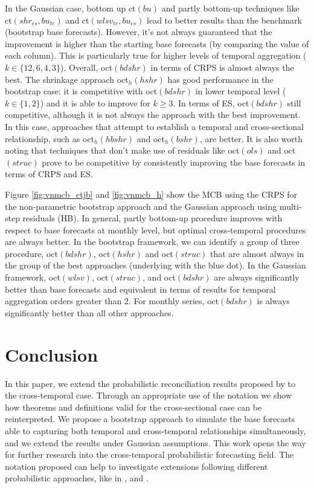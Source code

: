 \documentclass[a4paper,11pt]{article}
\theoremstyle{definition}
\begin{document}
In the Gaussian case, bottom up ct$(bu)$ and partly bottom-up techniques like ct$(shr_{cs}, bu_{te})$ and ct$(wlsv_{te}, bu_{cs})$ lead to better results than the benchmark (bootstrap base forecasts). However, it's not always guaranteed that the improvement is higher than the starting base forecasts (by comparing the value of each column). This is particularly true for higher levels of temporal aggregation ($k \in \{12, 6, 4, 3\}$). Overall, oct$(bdshr)$ in terms of CRPS is almost always the best. The shrinkage approach oct$_h(hshr)$ has good performance in the bootstrap case: it is competitive with oct$(bdshr)$ in lower temporal level ($k \in \{1,2\}$) and it is able to improve for $k\ge 3$. In terms of ES, oct$(bdshr)$ still competitive, although it is not always the approach with the best improvement. In this case, approaches that attempt to establish a temporal and cross-sectional relationship, such as oct$_h(hbshr)$ and oct$_h(bshr)$, are better. %
It is also worth noting that techniques that don't make use of residuals like oct$(ols)$ and oct$(struc)$ prove to be competitive by consistently improving the base forecasts in terms of CRPS and ES.

Figure \ref{fig:vnmcb_ctjb} and \ref{fig:vnmcb_h} show the MCB using the CRPS for the non-parametric bootstrap approach and the Gaussian approach using multi-step residuals (HB). In general, partly bottom-up procedure improves with respect to base forecasts at monthly level, but optimal cross-temporal procedures are always better. In the bootstrap framework, we can identify a group of three procedure, oct$(bdshr)$, oct$(hshr)$ and oct$(struc)$ that are almost always in the group of the best approaches (underlying with the blue dot). In the Gaussian framework, oct$(wlsv)$, oct$(struc)$, and oct$(bdshr)$ are always significantly better than base forecasts and equivalent in terms of results for temporal aggregation orders greater than 2. For monthly series, oct$(bdshr)$ is always significantly better than all other approaches.

\section{Conclusion}\label{sec:conclusion}

In this paper, we extend the probabilistic reconciliation results proposed by \cite{panagiotelis2023} to the cross-temporal case. Through an appropriate use of the notation we show how theorems and definitions valid for the cross-sectional case can be reinterpreted. We propose a bootstrap approach to simulate the base forecasts able to capturing both temporal and cross-temporal relationships simultaneously, and we extend the results under Gaussian assumptions. This work opens the way for further research into the cross-temporal probabilistic forecasting field. The notation proposed can help to investigate extensions following different probabilistic approaches, like in \cite{jeon2019}, \cite{bentaieb2021} and \cite{corani2022}.
\end{document}
